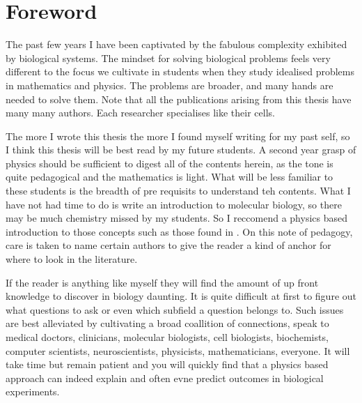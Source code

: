 \chapter*{Foreword}
\setcounter{page}{1}
\label{chap:foreward}
\chapquote{} {}
\vspace
The past few years I have been captivated by the fabulous complexity exhibited by biological systems. The mindset for solving biological problems feels very different to the focus we cultivate in students when they study idealised problems in mathematics and physics. The problems are broader, and many hands are needed to solve them. Note that all the publications arising from this thesis have many many authors. Each researcher specialises like their cells.

The more I wrote this thesis the more I found myself writing for my past self, so I think this thesis will be best read by my future students. A second year grasp of physics should be sufficient to digest all of the contents herein, as the tone is quite pedagogical and the mathematics is light. What will be less familiar to these students is the breadth of pre requisits to understand teh contents. What I have not had time to do is write an introduction to molecular biology, so there may be much chemistry missed by my students. So I reccomend a physics based introduction to those concepts such as those found in \cite{phillips2012}. On this note of pedagogy, care is taken to name certain authors to give the reader a kind of anchor for where to look in the literature.  

If the reader is anything like myself they will find the amount of up front knowledge to discover in biology daunting. It is quite difficult at first to figure out what questions to ask or even which subfield a question belongs to. Such issues are best alleviated by cultivating a broad coallition of connections, speak to medical doctors, clinicians, molecular biologists, cell biologists, biochemists, computer scientists, neuroscientists, physicists, mathematicians, everyone. It will take time but remain patient and you will quickly find that a physics based approach can indeed explain and often evne predict outcomes in biological experiments.

